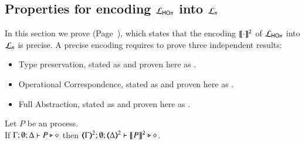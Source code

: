 

\subsection{Properties for encoding $\mathcal{L}_{\mathsf{HO}\pi}$ into $\mathcal{L}_{\pi}$}
\label{app:enc:HOp_to_sessp}

In this section we prove  (Page~\pageref{f:enc:hotopi}), which 
states that the encoding $\llbracket\cdot\rrbracket^\mathtt{2}$ of 
$\mathcal{L}_{\mathsf{HO}\pi}$ into $\mathcal{L}_{\pi}$ is precise.
A precise encoding requires to prove three independent results:
\begin{itemize}
	\item	Type preservation, stated as  and proven here as
	.
	\item	Operational Correspondence, stated as  
	and proven here as .
	\item	Full Abstraction, stated as  and proven here 
	as .
\end{itemize}


\begin{proposition}\rm
	\label{app:prop:typepres_HOp_to_p}
	Let $P$ be an \HOp process. \\
	If $\Gamma; \emptyset; \Delta \vdash P \triangleright \diamond$ then 
	$\mapt{\Gamma}^{2}; \emptyset; \mapt{\Delta}^{2} \proves \pmap{P}{2} \hastype \Proc$.
\end{proposition}




